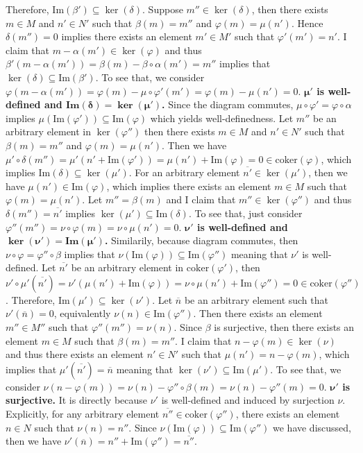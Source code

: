 \begin{solution}
    Therefore, $\text{Im}(\beta')\subseteq \ker(\delta)$. Suppose $m''\in\ker(\delta)$, then there exists $m\in M$ and $n'\in N'$ such that $\beta(m)=m''$ and $\varphi(m)=\mu(n')$.
    Hence $\delta(m'')=0$ implies there exists an element $m'\in M'$ such that $\varphi'(m')=n'$.  I claim that $m-\alpha(m')\in \ker(\varphi)$ and thus $\beta'(m-\alpha(m'))=\beta(m)-\beta\circ\alpha(m')=m''$ implies 
    that $\ker(\delta)\subseteq\text{Im}(\beta')$. To see that, we consider $\varphi(m-\alpha(m')) = \varphi(m) -\mu\circ\varphi'(m') = \varphi(m)-\mu(n')=0$.
    \textbf{$\bm{\mu'}$ is well-defined and $\bm{\textbf{Im}(\delta)=\ker(\mu')}$.} Since the diagram commutes, $\mu\circ\varphi' = \varphi\circ\alpha$ implies $\mu(\text{Im}(\varphi'))\subseteq \text{Im}(\varphi)$ which 
    yields well-definedness. Let $m''$ be an arbitrary element in $\ker(\varphi'')$ then there exists $m\in M$ and $n'\in N'$ such that $\beta(m) = m''$ and $\varphi(m)=\mu(n')$. Then we have $\mu'\circ\delta(m'') = \mu'(n'+\text{Im}(\varphi')) = \mu(n') + \text{Im}(\varphi)=0\in\text{coker}(\varphi)$,
    which implies $\text{Im}(\delta)\subseteq \ker(\mu')$. For an arbitrary element $\overline{n'}\in\ker(\mu')$, then we have 
    $\mu(n')\in\text{Im}(\varphi)$, which implies there exists an element $m\in M$ such that $\varphi(m)=\mu(n')$. Let $m'' = \beta(m)$ and I claim that $m''\in \ker(\varphi'')$
    and thus $\delta(m'') = \overline{n'}$ implies $\ker(\mu')\subseteq \text{Im}(\delta)$. To see that, just consider $\varphi''(m'')=\nu\circ\varphi(m) = \nu\circ\mu(n')=0$.
    \textbf{$\bm{\nu'}$ is well-defined and $\bm{\ker(\nu')=\textbf{Im}(\mu')}$.} Similarily, because diagram commutes, then $\nu\circ\varphi = \varphi''\circ\beta$ implies that $\nu(\text{Im}(\varphi))\subseteq \text{Im}(\varphi'')$
    meaning that $\nu'$ is well-defined. Let $\overline{n'}$ be an arbitrary element in $\text{coker}(\varphi')$, then $\nu'\circ\mu'(\overline{n'}) = \nu'(\mu(n')+\text{Im}(\varphi))= \nu\circ\mu (n') + \text{Im}(\varphi'') = 0\in \text{coker}(\varphi'')$.
    Therefore, $\text{Im}(\mu')\subseteq \ker(\nu')$. Let $\overline{n}$ be an arbitrary element such that $\nu'(\overline{n})=0$, equivalently $\nu(n)\in \text{Im}(\varphi'')$. Then there exists
    an element $m''\in M''$ such that $\varphi''(m'')=\nu(n)$. Since $\beta$ is surjective, then there exists an element $m\in M$ such that $\beta(m)=m''$. I claim that 
    $n-\varphi(m)\in\ker(\nu)$ and thus there exists an element $n'\in N'$ such that $\mu(n')= n-\varphi(m)$, which implies that $\mu'(\overline{n'}) = \overline{n}$ meaning that $\ker(\nu')\subseteq\text{Im}(\mu')$.
    To see that, we consider $\nu(n-\varphi(m)) = \nu(n)-\varphi''\circ\beta(m)=\nu(n)-\varphi''(m)=0$.
    \textbf{$\bm\nu'$ is surjective.} It is directly because $\nu'$ is well-defined and induced by surjection $\nu$. Explicitly, for any arbitrary element $\overline{n''}\in\text{coker}(\varphi'')$, there exists an element $n\in N$ such that 
    $\nu(n)=n''$. Since $\nu(\text{Im}(\varphi))\subseteq \text{Im}(\varphi'')$ we have discussed, then we have $\nu'(\overline{n})=n''+\text{Im}(\varphi'')=\overline{n''}$. 
\end{solution}





